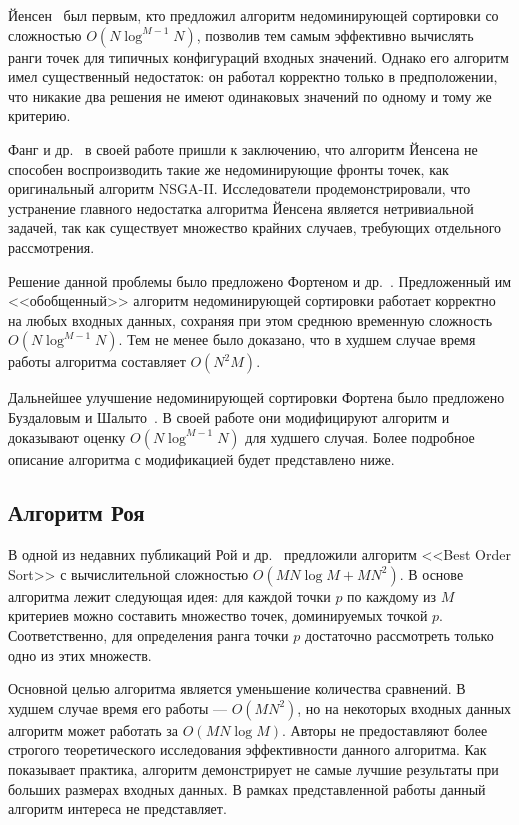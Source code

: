 Йенсен~\cite{jensen03} был первым, кто предложил алгоритм недоминирующей сортировки со сложностью $O(N\log^{M-1}N)$, позволив тем самым эффективно вычислять ранги точек для типичных конфигураций входных значений.
Однако его алгоритм имел существенный недостаток: он работал корректно только в предположении, что никакие два решения не имеют одинаковых значений по одному и тому же критерию.

Фанг и др.~\cite{fang08} в своей работе пришли к заключению, что алгоритм Йенсена не способен воспроизводить такие же недоминирующие фронты точек, как оригинальный алгоритм NSGA-II.
Исследователи продемонстрировали, что устранение главного недостатка алгоритма Йенсена является нетривиальной задачей, так как существует множество крайних случаев, требующих отдельного рассмотрения.

Решение данной проблемы было предложено Фортеном и др.~\cite{fortin13}.
Предложенный им <<обобщенный>> алгоритм недоминирующей сортировки работает корректно на любых входных данных, сохраняя при этом среднюю временную сложность $O(N\log^{M-1}N)$.
Тем не менее было доказано, что в худшем случае время работы алгоритма составляет $O(N^2M)$.

Дальнейшее улучшение недоминирующей сортировки Фортена было предложено Буздаловым и Шалыто~\cite{buzdalov14}.
В своей работе они модифицируют алгоритм и доказывают оценку $O(N\log^{M-1}N)$ для худшего случая.
Более подробное описание алгоритма с модификацией будет представлено ниже.

\subsection{Алгоритм Роя}
В одной из недавних публикаций Рой и др.~\cite{roy16} предложили алгоритм <<Best Order Sort>> с вычислительной сложностью $O(MN\log{M}+MN^2)$.
В основе алгоритма лежит следующая идея: для каждой точки $p$ по каждому из $M$ критериев можно составить множество точек, доминируемых точкой $p$.
Соответственно, для определения ранга точки $p$ достаточно рассмотреть только одно из этих множеств.

Основной целью алгоритма является уменьшение количества сравнений.
В худшем случае время его работы --- $O(MN^2)$, но на некоторых входных данных алгоритм может работать за $O(MN\log{M})$.
Авторы не предоставляют более строгого теоретического исследования эффективности данного алгоритма.
Как показывает практика, алгоритм демонстрирует не самые лучшие результаты при больших размерах входных данных.
В рамках представленной работы данный алгоритм интереса не представляет.

